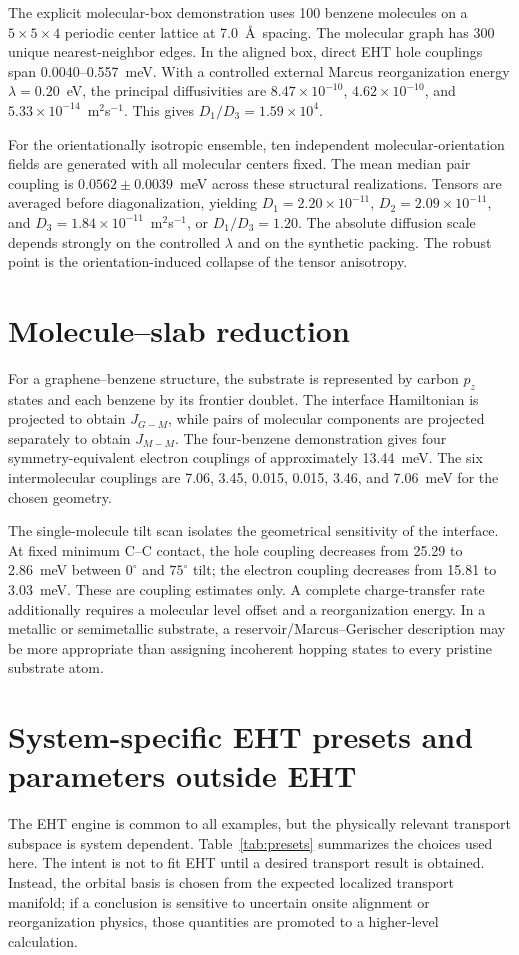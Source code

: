 \documentclass[aps,prmaterials,onecolumn,amsmath,amssymb,superscriptaddress]{revtex4-2}
\begin{document}
The explicit molecular-box demonstration uses 100 benzene molecules on a $5\times5\times4$ periodic center lattice at 7.0~\AA\ spacing. The molecular graph has 300 unique nearest-neighbor edges. In the aligned box, direct EHT hole couplings span 0.0040--0.557~meV. With a controlled external Marcus reorganization energy $\lambda=0.20$~eV, the principal diffusivities are $8.47\times10^{-10}$, $4.62\times10^{-10}$, and $5.33\times10^{-14}$~m$^2$s$^{-1}$. This gives $D_1/D_3=1.59\times10^4$.

For the orientationally isotropic ensemble, ten independent molecular-orientation fields are generated with all molecular centers fixed. The mean median pair coupling is $0.0562\pm0.0039$~meV across these structural realizations. Tensors are averaged before diagonalization, yielding $D_1=2.20\times10^{-11}$, $D_2=2.09\times10^{-11}$, and $D_3=1.84\times10^{-11}$~m$^2$s$^{-1}$, or $D_1/D_3=1.20$. The absolute diffusion scale depends strongly on the controlled $\lambda$ and on the synthetic packing. The robust point is the orientation-induced collapse of the tensor anisotropy.

\section{Molecule--slab reduction}
For a graphene--benzene structure, the substrate is represented by carbon $p_z$ states and each benzene by its frontier doublet. The interface Hamiltonian is projected to obtain $J_{G-M}$, while pairs of molecular components are projected separately to obtain $J_{M-M}$. The four-benzene demonstration gives four symmetry-equivalent electron couplings of approximately 13.44~meV. The six intermolecular couplings are 7.06, 3.45, 0.015, 0.015, 3.46, and 7.06~meV for the chosen geometry.

The single-molecule tilt scan isolates the geometrical sensitivity of the interface. At fixed minimum C--C contact, the hole coupling decreases from 25.29 to 2.86~meV between $0^\circ$ and $75^\circ$ tilt; the electron coupling decreases from 15.81 to 3.03~meV. These are coupling estimates only. A complete charge-transfer rate additionally requires a molecular level offset and a reorganization energy. In a metallic or semimetallic substrate, a reservoir/Marcus--Gerischer description may be more appropriate than assigning incoherent hopping states to every pristine substrate atom.

\section{System-specific EHT presets and parameters outside EHT}
The EHT engine is common to all examples, but the physically relevant transport subspace is system dependent. Table~\ref{tab:presets} summarizes the choices used here. The intent is not to fit EHT until a desired transport result is obtained. Instead, the orbital basis is chosen from the expected localized transport manifold; if a conclusion is sensitive to uncertain onsite alignment or reorganization physics, those quantities are promoted to a higher-level calculation.
\end{document}
